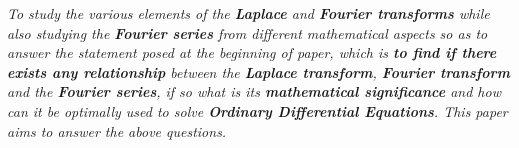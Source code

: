 \textit{To study the various elements of the \textbf{Laplace} and \textbf{Fourier transforms} while also studying the \textbf{Fourier series} from different mathematical aspects so as to answer the statement posed at the beginning of paper, which is \textbf{to find if there exists any relationship} between the \textbf{Laplace transform}, \textbf{Fourier transform} and the \textbf{Fourier series}, if so what is its \textbf{mathematical significance} and how can it be optimally used to solve \textbf{Ordinary Differential Equations}. This paper aims to answer the above questions.}
